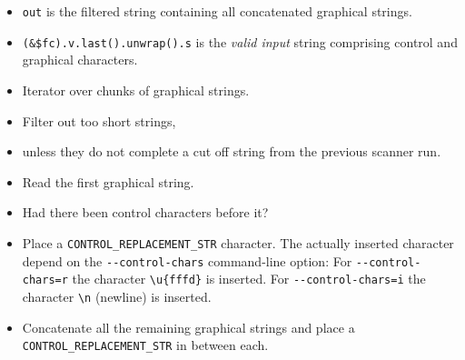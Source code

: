 \begin{Shaded}
\begin{Highlighting}[]
 
  
\NormalTok{\{}
      
        \NormalTok{|}
                           
        \NormalTok{)  }
        \NormalTok{)}

      
         
        \NormalTok{\}}
          
        \NormalTok{\}}
    \NormalTok{\}}
\NormalTok{\};}
\end{Highlighting}
\end{Shaded}

\begin{itemize}
\item
  \texttt{out} is the filtered string containing all concatenated
  graphical strings.
\item
  \texttt{(\&\$fc).v.last().unwrap().s} is the \emph{valid input} string
  comprising control and graphical characters.
\item
  Iterator over chunks of graphical strings.
\item
  Filter out too short strings,
\item
  unless they do not complete a cut off string from the previous scanner
  run.
\item
  Read the first graphical string.
\item
  Had there been control characters before it?
\item
  Place a \texttt{CONTROL\_REPLACEMENT\_STR} character. The actually
  inserted character depend on the \texttt{-\/-control-chars}
  command-line option: For \texttt{-\/-control-chars=r} the character
  \texttt{\textbackslash{}u\{fffd\}} is inserted. For
  \texttt{-\/-control-chars=i} the character \texttt{\textbackslash{}n}
  (newline) is inserted.
\item
  Concatenate all the remaining graphical strings and place a
  \texttt{CONTROL\_REPLACEMENT\_STR} in between each.
\end{itemize}

